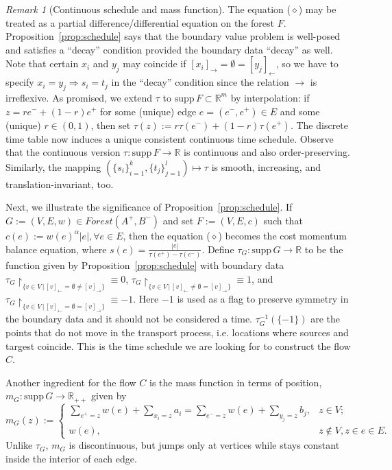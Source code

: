\documentclass[fleqn]{article}
\theoremstyle{definition}
\theoremstyle{remark}
\newtheorem{rem}[thm]{Remark}
\newcommand{\supp}{\mathrm{supp}\,} %
\begin{document}
\begin{rem}[Continuous schedule and mass function]
The equation ($\diamond$) may be treated as a partial difference/differential equation on the forest $F$. Proposition~\ref{prop:schedule} says that the boundary value problem is well-posed and satisfies a ``decay'' condition provided the boundary data ``decay'' as well. Note that certain $x_i$ and $y_j$ may coincide if $[x_i]_\rightarrow =\emptyset= [y_j]_\leftarrow$, so we have to specify $x_i=y_j \Rightarrow s_i=t_j$ in the ``decay'' condition since the relation $\rightarrow$ is irreflexive.  As promised, we extend $\tau$ to $\supp F \subset \mathbb{R}^m$ by interpolation: if $z=r e^- + (1-r) e^+$ for some (unique) edge $e=(e^-,e^+) \in E$ and some (unique) $r\in(0,1)$, then set $\tau(z):=r\tau(e^-)+(1-r)\tau(e^+)$. The discrete time table now induces a unique consistent continuous time schedule. Observe that the continuous version $\tau: \supp F \rightarrow \mathbb{R}$ is continuous and also order-preserving. Similarly, the mapping $\left( \{s_i\}_{i=1}^k, \{t_j\}_{j=1}^l \right) \mapsto \tau$ is smooth, increasing, and translation-invariant, too.
\par
Next, we illustrate the significance of Proposition~\ref{prop:schedule}. If $G:=(V,E,w)\in Forest(A^+,B^-)$ and set $F:=(V,E,c)$ such that $c(e):=w(e)^\alpha |e|, \forall e\in E$, then the equation ($\diamond$) becomes the cost momentum balance equation, where $s(e)=\frac{|e|}{\tau(e^+)-\tau(e^-)}$. Define $\tau_G:\supp G \rightarrow \mathbb{R}$ to be the function given by Proposition~\ref{prop:schedule} with boundary data $\tau_G\!\!\restriction_{\{v\in V \,|\, [v]_\leftarrow =\emptyset \ne [v]_\rightarrow \}} \equiv 0$, $\tau_
G\!\!\restriction_{\{v\in V \,|\, [v]_\leftarrow \ne\emptyset= [v]_\rightarrow \}} \equiv 1$, and $\tau_
G\!\!\restriction_{\{v\in V \,|\, [v]_\leftarrow =\emptyset= [v]_\rightarrow \}} \equiv -1$. Here $-1$ is used as a flag to preserve symmetry in the boundary data and it should not be considered a time. $\tau_G^{-1}(\{-1\})$ are the points that do not move in the transport process, i.e. locations where sources and targest coincide. This is the time schedule we are looking for to construct the flow $C$.
\par
Another ingredient for the flow $C$ is the mass function in terms of position, 
$m_G:\supp G \rightarrow \mathbb{R}_{++}$ given by
$$m_G(z):=
\begin{cases}
\sum_{e^+=z}w(e) +\sum_{x_i=z}a_i =\sum_{e^-=z}w(e) +\sum_{y_j=z}b_j, & z\in V; \\
w(e), & z\not\in V, z\in e\in E.
\end{cases}$$
Unlike $\tau_G$, $m_G$ is discontinuous, but jumps only at vertices while stays constant inside the interior of each edge.
\end{rem}
\end{document}
